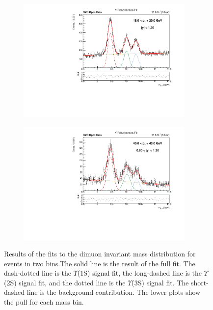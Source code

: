 \documentclass[a4paper,11pt]{article}
\begin{document}
\begin{figure}[h]
    \centering
    \begin{subfigure}{.49\textwidth}
    \centering
    \includegraphics[width=0.95\textwidth]{YResonances_3.pdf}
    \end{subfigure}
    \begin{subfigure}{.49\textwidth}
  \centering
    \includegraphics[width=0.95\textwidth]{YResonancesFit.pdf}
    \end{subfigure}
    \caption{Results of the fits to the dimuon invariant mass distribution for events in two bins.The solid line is the result of the full fit. The dash-dotted line is the $\Upsilon$(1S) signal fit, the long-dashed line is the $\Upsilon$(2S) signal fit, and the dotted line is the $\Upsilon$(3S) signal fit. The short-dashed line is the background contribution. The lower plots show the pull for each mass bin.}
    \label{fig:fit}
\end{figure}%
\end{document}

